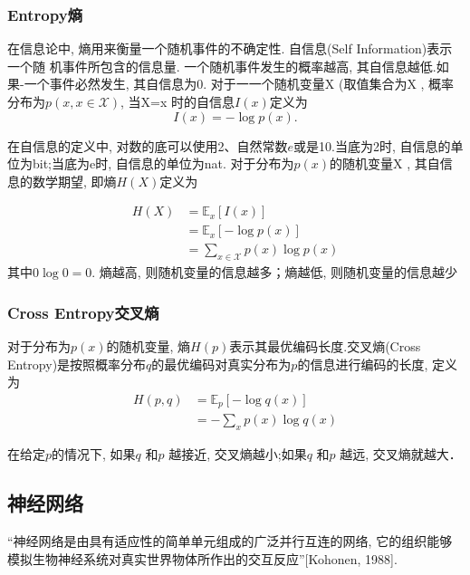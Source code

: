 \subsubsection{Entropy熵}
在信息论中, 熵用来衡量一个随机事件的不确定性.
 自信息(Self Information)表示一个随 机事件所包含的信息量. 一个随机事件发生的概率越高, 其自信息越低.如果-一个事件必然发生, 其自信息为0.
 对于一一个随机变量X (取值集合为X , 概率分布为$p(x,  x \in \mathcal{X})$, 当X=x
 时的自信息$I(x)$定义为
 \begin{equation}
      I(x)=- \log p(x).
 \end{equation} 
 
 在自信息的定义中, 对数的底可以使用2、自然常数$e$或是10.当底为2时, 自信息的单位为bit;当底为e时, 自信息的单位为nat.
 对于分布为$p(x)$的随机变量X , 其自信息的数学期望, 即熵$H(X)$定义为
 
 \begin{equation}
    \begin{split}
 H(X) &= \mathbb{E}_x\left[  I(x)\right] \\
 &= \mathbb{E}_x \left[  -\log p(x) \right] \\
 &=\sum_{x \in \mathcal{X}}p(x) \log p(x)    
\end{split}
 \end{equation}
 其中$ 0 \log 0= 0 $.
 熵越高, 则随机变量的信息越多；熵越低, 则随机变量的信息越少

\subsubsection{Cross Entropy交叉熵}
对于分布为$p(x)$的随机变量, 熵$H(p)$表示其最优编码长度.交叉熵(Cross Entropy)是按照概率分布$q$的最优编码对真实分布为$p$的信息进行编码的长度, 定义为 
\begin{equation}
 \begin{split}
        H(p, q)&= \mathbb{E}_p \left[ -\log q(x) \right]  \\
        &= - \sum_x p(x) \log q(x) 
 \end{split}
\end{equation}
 
在给定$p$的情况下, 如果$q$ 和$p$ 越接近, 交叉熵越小;如果$q$ 和$p$ 越远, 交叉熵就越大．


\subsection{神经网络}
“神经网络是由具有适应性的简单单元组成的广泛并行互连的网络, 它的组织能够模拟生物神经系统对真实世界物体所作出的交互反应”[Kohonen,  1988].

